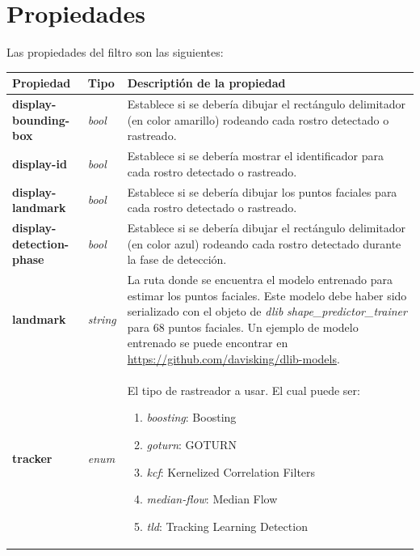 \documentclass[a4paper,openright,12pt]{report}
\begin{document}
\section{Propiedades}
Las propiedades del filtro son las siguientes:
\begin{center}
  \begin{longtable}{| p{} | p{} | p{} |}
  \hline

  \textbf{Propiedad} &
  \textbf{Tipo} &
  \textbf{Descriptión de la propiedad}
  \\ \hline

  \textbf{display-bounding-box} &
  \textit{bool} &
  Establece si se debería dibujar el rectángulo delimitador (en color amarillo)
  rodeando cada rostro detectado o rastreado.
  \\ \hline

  \textbf{display-id} &
  \textit{bool} &
  Establece si se debería mostrar el identificador para cada rostro detectado o
  rastreado.
  \\ \hline

  \textbf{display-landmark} &
  \textit{bool} &
  Establece si se debería dibujar los puntos faciales para cada rostro detectado
  o rastreado.
  \\ \hline

  \textbf{display-detection-phase} &
  \textit{bool} &
  Establece si se debería dibujar el rectángulo delimitador (en color azul)
  rodeando cada rostro detectado durante la fase de detección.
  \\ \hline

  \textbf{landmark} &
  \textit{string} &
  La ruta donde se encuentra el modelo entrenado para estimar los puntos
  faciales. Este modelo debe haber sido serializado con el objeto de
  \textit{dlib} \textit{shape\_predictor\_trainer} para 68 puntos faciales. Un
  ejemplo de modelo entrenado se puede encontrar en
  \href{https://github.com/davisking/dlib-models}{https://github.com/davisking/dlib-models}.
  \\ \hline

  \textbf{tracker} &
  \textit{enum} &
  El tipo de rastreador a usar. El cual puede ser:
  \begin{enumerate}
    \setcounter{enumi}{0}
    \item \textit{boosting}: Boosting
    \item \textit{goturn}: GOTURN
    \item \textit{kcf}: Kernelized Correlation Filters
    \item \textit{median-flow}: Median Flow
    \item \textit{tld}: Tracking Learning Detection
  \end{enumerate}
  \\ \hline


\end{longtable}
\end{center}
\end{document}
